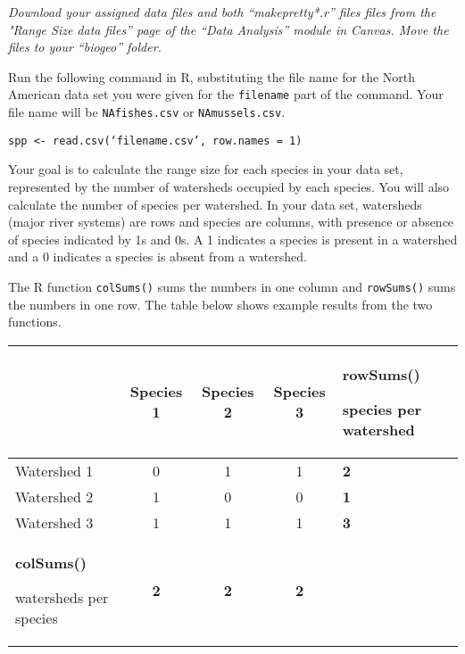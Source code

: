 \documentclass[11pt]{article}
\begin{document}
\textit{Download your assigned data files and both “makepretty*.r” files files from the "Range Size data files” page of the “Data Analysis” module in Canvas. Move the files to your “biogeo” folder.}

Run the following command in R, substituting the file name for the North American
data set you were given for the \texttt{filename} part of the command. Your file name 
will be \texttt{NAfishes.csv} or \texttt{NAmussels.csv}. 


\texttt{spp \textless{}-
read.csv(‘filename.csv’, row.names = 1)}

%

Your goal is to calculate the range size for each species in your
data set, represented by the number of watersheds occupied by each
species. You will also calculate the number of species per watershed. In your 
data set, watersheds (major river systems) are rows and species are columns, with presence or absence of
species indicated by 1s and 0s. A 1 indicates a species is present in a
watershed and a 0 indicates a species is absent from a watershed.

The R function \texttt{colSums()} sums the numbers in one column and \texttt{rowSums()} 
sums the numbers in one row. The table below shows example results from the 
two functions.

\label{tab:colrowsums}
\begin{longtable}[c]{@{}L{1.5in}cccC{1.5in}@{}}
\toprule
& Species 1 & Species 2 & Species 3 & \textbf{rowSums()}

species per watershed\tabularnewline
\midrule
\endhead
Watershed 1 & 0 & 1 & 1 & \textbf{2}\tabularnewline
Watershed 2 & 1 & 0 & 0 & \textbf{1}\tabularnewline
Watershed 3 & 1 & 1 & 1 & \textbf{3}\tabularnewline
\textbf{colSums()}

watersheds per species & \textbf{2} & \textbf{2} & \textbf{2}
&\tabularnewline
\bottomrule
\end{longtable}
\end{document}
